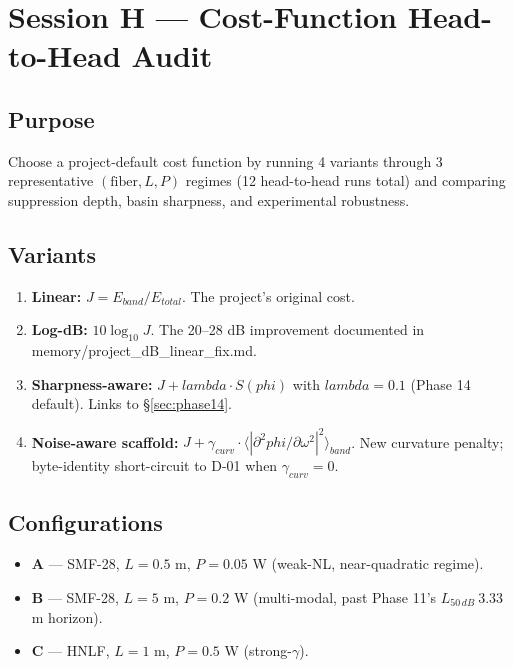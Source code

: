 \documentclass[11pt,letterpaper]{article}
\def\varphi{phi}%
\def\mathrm#1{#1}%
\def\lambda{lambda}%
\def\approx{~}%
\def\texttt#1{#1}%
\begin{document}
\newpage
\section{Session H --- Cost-Function Head-to-Head Audit}
\label{sec:sessionH}

\subsection{Purpose}

Choose a project-default cost function by running 4 variants through 3 representative $(\text{fiber}, L, P)$ regimes (12 head-to-head runs total) and comparing suppression depth, basin sharpness, and experimental robustness.

\subsection{Variants}

\begin{enumerate}[label=D-0\arabic*., leftmargin=*]
  \item \textbf{Linear:} $J = E_{\mathrm{band}} / E_{\mathrm{total}}$. The project's original cost.
  \item \textbf{Log-dB:} $10 \log_{10} J$. The 20--28 dB improvement documented in \texttt{memory/project\_dB\_linear\_fix.md}.
  \item \textbf{Sharpness-aware:} $J + \lambda \cdot S(\varphi)$ with $\lambda = 0.1$ (Phase 14 default). Links to \S\ref{sec:phase14}.
  \item \textbf{Noise-aware scaffold:} $J + \gamma_{\mathrm{curv}} \cdot \langle |\partial^2 \varphi / \partial \omega^2|^2 \rangle_{\mathrm{band}}$. New curvature penalty; byte-identity short-circuit to D-01 when $\gamma_{\mathrm{curv}} = 0$.
\end{enumerate}

\subsection{Configurations}

\begin{itemize}[leftmargin=*]
  \item \textbf{A} --- SMF-28, $L = 0.5$ m, $P = 0.05$ W (weak-NL, near-quadratic regime).
  \item \textbf{B} --- SMF-28, $L = 5$ m, $P = 0.2$ W (multi-modal, past Phase 11's $L_{50\,\mathrm{dB}} \approx 3.33$ m horizon).
  \item \textbf{C} --- HNLF, $L = 1$ m, $P = 0.5$ W (strong-$\gamma$).
\end{itemize}
\end{document}
